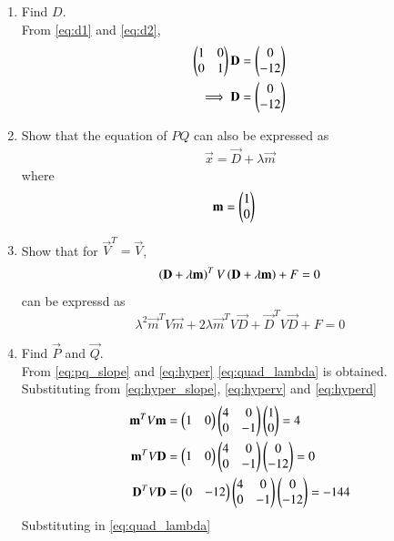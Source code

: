 \documentclass[journal,12pt,twocolumn]{IEEEtran}
\renewcommand\thesection{\arabic{section}}
\begin{document}
\begin{enumerate}[label=\thesection.\arabic*
,ref=\thesection.\theenumi]
\begin{align}
\implies \myvec{1 & 0}\vec{x} &= 0
\label{eq:d2}
\end{align}
%
\item Find $D$.
\\
\solution
From \eqref{eq:d1} and \eqref{eq:d2},
\begin{align}
 \begin{pmatrix}1 & 0 \\ 0 &  1\end{pmatrix}\mathbf{D} &= \begin{pmatrix}0 \\ -12 \end{pmatrix}
\\
\implies  \mathbf{D} &= \begin{pmatrix}0 \\ -12 \end{pmatrix}
\label{eq:hyperd}
\end{align}
%
\item Show that the equation of $PQ$ can also be expressed as
\begin{align}
\label{eq:pq_slope}
\vec{x} = \vec{D}+\lambda \vec{m}
\end{align}
where
\begin{align}
\mathbf{m} &=   \begin{pmatrix}1 \\ 0\end{pmatrix}
\label{eq:hyper_slope}
\end{align}
%
\item Show that for $\vec{V}^T = \vec{V}$,
\begin{equation}
\label{eq:quad_md}
\left(\mathbf{D}+\lambda\mathbf{m}\right)^TV\left(\mathbf{D}+\lambda\mathbf{m}\right) + F= 0 
\end{equation}
can be expressd as
\begin{equation}
\label{eq:quad_lambda}
\lambda^2\vec{m}^TV\vec{m}+2\lambda\vec{m}^TV\vec{D}+\vec{D}^TV\vec{D}
+ F = 0
\end{equation}
%
\item Find $\vec{P}$ and $\vec{Q}$.
\\
\solution From \eqref{eq:pq_slope} and \eqref{eq:hyper} \eqref{eq:quad_lambda} is obtained.
%
Substituting from \eqref{eq:hyper_slope}, \eqref{eq:hyperv} and \eqref{eq:hyperd}
\begin{align}
\mathbf{m}^TV\mathbf{m} &= \begin{pmatrix}1& 0\end{pmatrix} \begin{pmatrix}4 & 0 \\ 0 & -1\end{pmatrix}\begin{pmatrix}1 \\ 0\end{pmatrix} = 4
\\
\mathbf{m}^TV\mathbf{D} & = \begin{pmatrix}1& 0\end{pmatrix}\begin{pmatrix}4 & 0 \\ 0 & -1\end{pmatrix}\begin{pmatrix}0 \\ -12 \end{pmatrix} = 0
\\
\mathbf{D}^TV\mathbf{D} &= \begin{pmatrix}0 & -12 \end{pmatrix}\begin{pmatrix}4 & 0 \\ 0 & -1\end{pmatrix}\begin{pmatrix}0 \\ -12 \end{pmatrix} = -144
\end{align}
%
Substituting in \eqref{eq:quad_lambda}

\end{enumerate}
\end{document}
